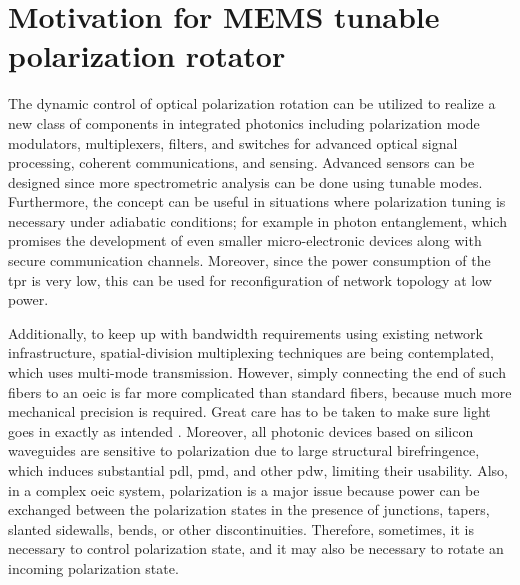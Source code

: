 \documentclass[../report.tex]{subfiles}
\begin{document}
	\section{Motivation for MEMS tunable polarization rotator} 
The dynamic control of optical polarization rotation can be utilized to realize a new class of components in integrated photonics including polarization mode modulators, multiplexers, filters, and switches for advanced optical signal processing, coherent communications, and sensing. Advanced sensors can be designed since more spectrometric analysis can be done using tunable modes. Furthermore, the concept can be useful in situations where polarization tuning is necessary under adiabatic conditions; for example in photon entanglement, which promises the development of even smaller micro-electronic devices along with secure communication channels. Moreover, since the power consumption of the \gls{tpr} is very low, this can be used for reconfiguration of network topology at low power. \par

Additionally, to keep up with bandwidth requirements using existing network infrastructure, spatial-division multiplexing techniques \cite{space_richardson_2013} are being contemplated, which uses multi-mode transmission. However, simply connecting the end of such fibers to an \gls{oeic} is far more complicated than standard fibers, because much more mechanical precision is required. Great care has to be taken to make sure light goes in exactly as intended \cite{hecht_is_2016}. Moreover, all photonic devices based on silicon waveguides are sensitive to polarization due to large structural birefringence, which induces substantial \gls{pdl}, \gls{pmd}, and other \gls{pdw}, limiting their usability. Also, in a complex \gls{oeic} system, polarization is a major issue because power can be exchanged between the polarization states in the presence of junctions, tapers, slanted sidewalls, bends, or other discontinuities. Therefore, sometimes, it is necessary to control polarization state, and it may also be necessary to rotate an incoming polarization state. \par
\end{document}
